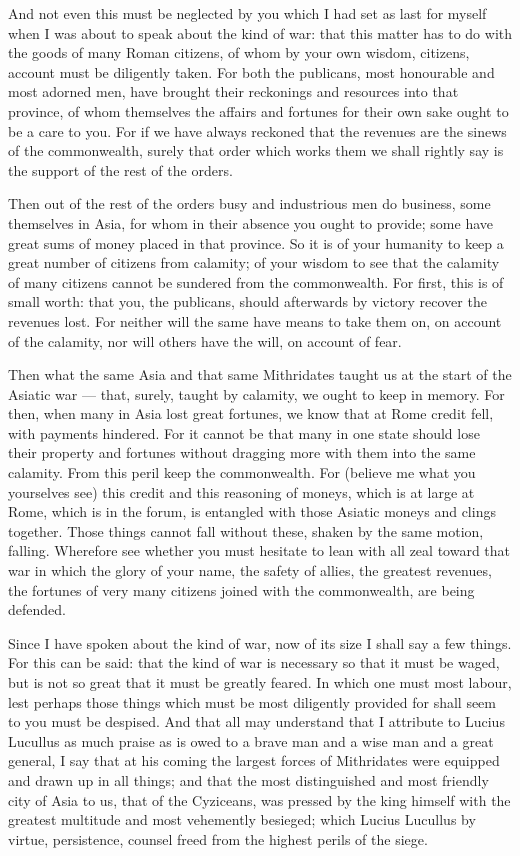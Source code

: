  And not even this must be neglected by you which I had set as last for myself when I was about to speak about the kind of war: that this matter has to do with the goods of many Roman citizens, of whom by your own wisdom, citizens, account must be diligently taken. For both the publicans, most honourable and most adorned men, have brought their reckonings and resources into that province, of whom themselves the affairs and fortunes for their own sake ought to be a care to you. For if we have always reckoned that the revenues are the sinews of the commonwealth, surely that order which works them we shall rightly say is the support of the rest of the orders.

 Then out of the rest of the orders busy and industrious men do business, some themselves in Asia, for whom in their absence you ought to provide; some have great sums of money placed in that province. So it is of your humanity to keep a great number of citizens from calamity; of your wisdom to see that the calamity of many citizens cannot be sundered from the commonwealth. For first, this is of small worth: that you, the publicans, should afterwards by victory recover the revenues lost. For neither will the same have means to take them on, on account of the calamity, nor will others have the will, on account of fear.

 Then what the same Asia and that same Mithridates taught us at the start of the Asiatic war --- that, surely, taught by calamity, we ought to keep in memory. For then, when many in Asia lost great fortunes, we know that at Rome credit fell, with payments hindered. For it cannot be that many in one state should lose their property and fortunes without dragging more with them into the same calamity. From this peril keep the commonwealth. For (believe me what you yourselves see) this credit and this reasoning of moneys, which is at large at Rome, which is in the forum, is entangled with those Asiatic moneys and clings together. Those things cannot fall without these, shaken by the same motion, falling. Wherefore see whether you must hesitate to lean with all zeal toward that war in which the glory of your name, the safety of allies, the greatest revenues, the fortunes of very many citizens joined with the commonwealth, are being defended.

 Since I have spoken about the kind of war, now of its size I shall say a few things. For this can be said: that the kind of war is necessary so that it must be waged, but is not so great that it must be greatly feared. In which one must most labour, lest perhaps those things which must be most diligently provided for shall seem to you must be despised. And that all may understand that I attribute to Lucius Lucullus as much praise as is owed to a brave man and a wise man and a great general, I say that at his coming the largest forces of Mithridates were equipped and drawn up in all things; and that the most distinguished and most friendly city of Asia to us, that of the Cyziceans, was pressed by the king himself with the greatest multitude and most vehemently besieged; which Lucius Lucullus by virtue, persistence, counsel freed from the highest perils of the siege.

